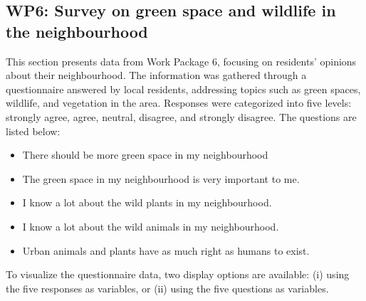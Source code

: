 


\subsection{WP6: Survey on green space and wildlife in the neighbourhood} \label{questionnaire}

This section presents data from Work Package 6, focusing on residents' opinions about their neighbourhood. The information was gathered through a questionnaire answered by local residents, addressing topics such as green spaces, wildlife, and vegetation in the area. Responses were categorized into five levels: strongly agree, agree, neutral, disagree, and strongly disagree. The questions are listed below:
\begin{itemize}
    \item There should be more green space in my neighbourhood
    \item The green space in my neighbourhood is very important to me.  
    \item I know a lot about the wild plants in my neighbourhood. 
    \item I know a lot about the wild animals in my neighbourhood. 
    \item Urban animals and plants have as much right as humans to exist.     
\end{itemize}
To visualize the questionnaire data, two display options are available: (i) using the five responses as variables, or (ii) using the five questions as variables.

